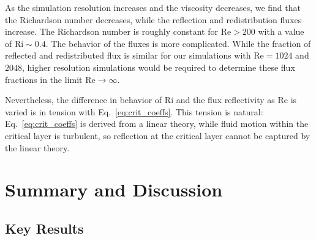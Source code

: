 \documentclass[
        fleqn,
        usenatbib,
    ]{mnras}
\begin{document}
As the simulation resolution increases and the viscosity decreases, we find that
the Richardson number decreases, while the reflection and redistribution fluxes
increase. The Richardson number is roughly constant for $\mathrm{Re} > 200$ with
a value of $\mathrm{Ri} \sim 0.4$. The behavior of the fluxes is more
complicated. While the fraction of reflected and redistributed flux is similar
for our simulations with $\mathrm{Re} = 1024$ and $2048$, higher resolution
simulations would be required to determine these flux fractions in the limit
$\mathrm{Re}\rightarrow\infty$.

Nevertheless, the difference in behavior of $\mathrm{Ri}$ and the flux
reflectivity as $\mathrm{Re}$ is varied is in tension with
Eq.~\eqref{eq:crit_coeffs}. This tension is natural: Eq.~\eqref{eq:crit_coeffs}
is derived from a linear theory, while fluid motion within the critical layer is
turbulent, so reflection at the critical layer cannot be captured by the linear
theory.

\section{Summary and Discussion}\label{s:discussion}

\subsection{Key Results}
\end{document}
